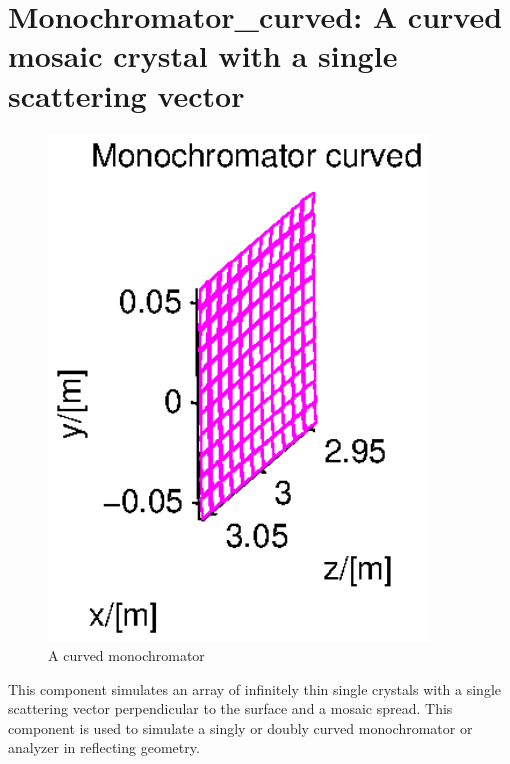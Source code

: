 \section{Monochromator\_curved: A curved mosaic crystal with
a single scattering vector}
\label{s:monochromator_curved}


\begin{figure}
  \begin{center}
    \includegraphics[width=0.9\textwidth]{figures/monochromator_curved.eps}
  \end{center}
\caption{A curved monochromator}
\label{f:monochromator_curved}
\end{figure}


This component simulates an array of infinitely thin single
crystals with a single scattering vector perpendicular to the
surface and a mosaic spread.
This component is used to simulate a singly or doubly
curved monochromator or analyzer in reflecting geometry.

